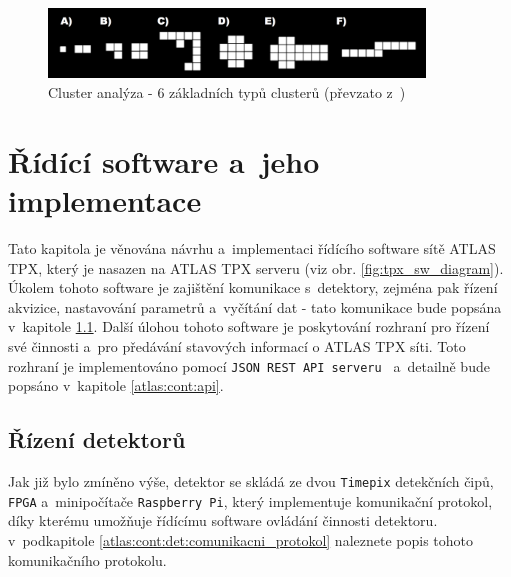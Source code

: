 \begin{figure}[t]
	\begin{center}
		\includegraphics[width=10cm]{figures/ca.png}
		\caption{Cluster analýza - 6 základních typů clusterů (převzato z~\cite{TurecekThesis2011})}
		\label{fig:tpx_ca}
	\end{center}
\end{figure}


\section{Řídící software a~jeho implementace}\label{atlas:cont}
Tato kapitola je věnována návrhu a~implementaci řídícího software sítě ATLAS TPX, který je nasazen na ATLAS TPX serveru (viz obr. \ref{fig:tpx_sw_diagram}). Úkolem  tohoto software je zajištění komunikace s~detektory, zejména pak řízení akvizice, nastavování parametrů a~vyčítání dat - tato komunikace bude popsána v~kapitole \ref{atlas:cont:det}. Další úlohou tohoto software je poskytování rozhraní pro řízení své činnosti a~pro předávání stavových informací o ATLAS TPX síti. Toto rozhraní je implementováno pomocí \texttt{JSON REST API serveru } a~detailně bude popsáno v~kapitole \ref{atlas:cont:api}.

\subsection{Řízení detektorů}\label{atlas:cont:det} %
Jak již bylo zmíněno výše, detektor se skládá ze dvou \texttt{Timepix} detekčních čipů, \texttt{FPGA} a~minipočítače \texttt{Raspberry Pi}, který implementuje komunikační protokol, díky kterému umožňuje řídícímu software ovládání činnosti detektoru. v~podkapitole \ref{atlas:cont:det:comunikacni_protokol} naleznete popis tohoto komunikačního protokolu.

